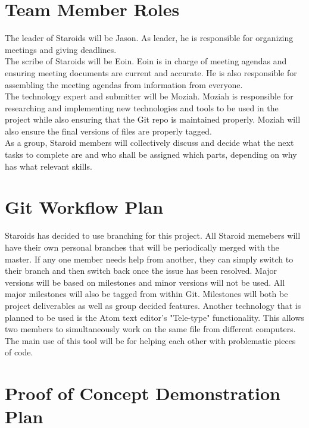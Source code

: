 \documentclass{article}
\begin{document}
\section{Team Member Roles}
The leader of Staroids will be Jason. As leader, he is responsible for organizing meetings and giving deadlines.\\
The scribe of Staroids will be Eoin. Eoin is in charge of meeting agendas and ensuring meeting documents are current and accurate. He is also responsible for assembling the meeting agendas from information from everyone.\\
The technology expert and submitter will be Moziah. Moziah is responsible for researching and implementing new technologies and tools to be used in the project while also ensuring that the Git repo is maintained properly. Moziah will also ensure the final versions of files are properly tagged.\\
As a group, Staroid members will collectively discuss and decide what the next tasks to complete are and who shall be assigned which parts, depending on why has what relevant skills.

\section{Git Workflow Plan}
Staroids has decided to use branching for this project. All Staroid memebers will have their own personal branches that will be periodically merged with the master. If any one member needs help from another, they can simply switch to their branch and then switch back once the issue has been resolved. Major versions will be based on milestones and minor versions will not be used. All major milestones will also be tagged from within Git. Milestones will both be project deliverables as well as group decided features. Another technology that is planned to be used is the Atom text editor's "Tele-type" functionality. This allows two members to simultaneously work on the same file from different computers. The main use of this tool will be for helping each other with problematic pieces of code.\\

\section{Proof of Concept Demonstration Plan}

\end{document}
